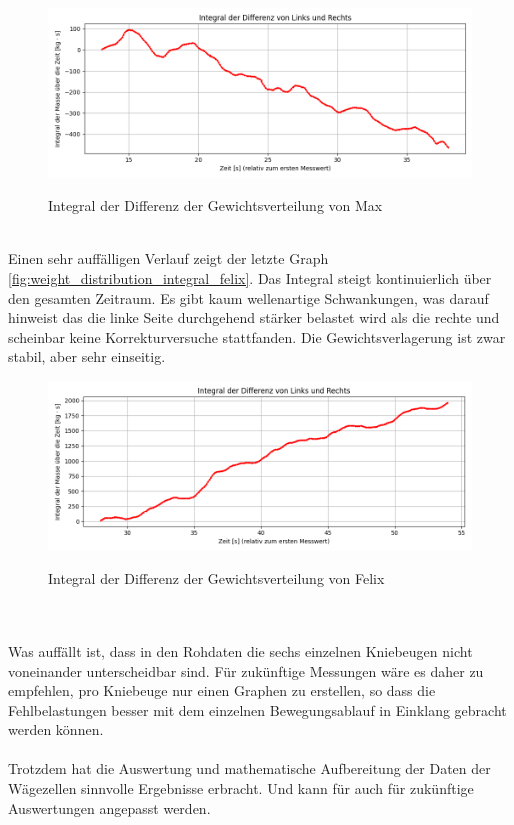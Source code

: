 \begin{figure}
  \centering
  \includegraphics[width=0.7\linewidth]{img/pyplots/Integral der Differenz - Max.png}\\
  \caption{Integral der Differenz der Gewichtsverteilung von Max}
  \label{fig:weight_distribution_integral_max}
\end{figure}
\\
Einen sehr auffälligen Verlauf zeigt der letzte Graph \autoref{fig:weight_distribution_integral_felix}.
Das Integral steigt kontinuierlich über den gesamten Zeitraum.
Es gibt kaum wellenartige Schwankungen, was darauf hinweist das die linke Seite durchgehend stärker belastet wird als die rechte und scheinbar keine Korrekturversuche stattfanden.
Die Gewichtsverlagerung ist zwar stabil, aber sehr einseitig.
\begin{figure}
  \centering
  \includegraphics[width=0.7\linewidth]{img/pyplots/Integral der Differenz - Felix.png}\\
  \caption{Integral der Differenz der Gewichtsverteilung von Felix}
  \label{fig:weight_distribution_integral_felix}
\end{figure}
\\
\\
Was auffällt ist, dass in den Rohdaten die sechs einzelnen Kniebeugen nicht voneinander unterscheidbar sind.
Für zukünftige Messungen wäre es daher zu empfehlen, pro Kniebeuge nur einen Graphen zu erstellen, so dass die Fehlbelastungen besser mit dem einzelnen Bewegungsablauf in Einklang gebracht werden können.\\
\\
Trotzdem hat die Auswertung und mathematische Aufbereitung der Daten der Wägezellen sinnvolle Ergebnisse erbracht. Und kann für auch für zukünftige Auswertungen angepasst werden.
